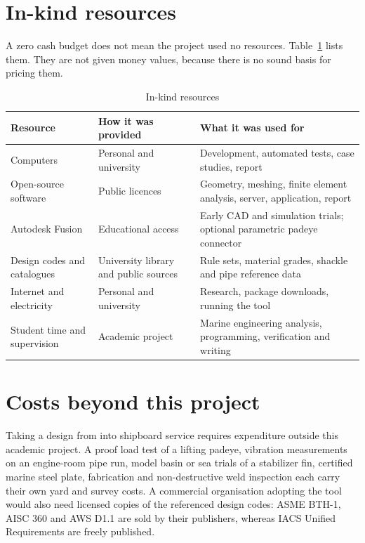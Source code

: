 \section{In-kind resources}
\label{sec:in-kind-resources}

A zero cash budget does not mean the project used no resources.
Table~\ref{tab:in-kind} lists them. They are not given money values, because
there is no sound basis for pricing them.

\begin{table}[H]
\centering
\caption{In-kind resources}
\label{tab:in-kind}
\small
\begin{tabularx}{\textwidth}{
    >{\raggedright\arraybackslash}p{}
    >{\raggedright\arraybackslash}X
    >{\raggedright\arraybackslash}X}
\toprule
\textbf{Resource} & \textbf{How it was provided} & \textbf{What it was used for}\\
\midrule
Computers & Personal and university & Development, automated tests, case studies, report\\
Open-source software & Public licences & Geometry, meshing, finite element analysis, server, application, report\\
Autodesk Fusion & Educational access & Early CAD and simulation trials; optional parametric padeye connector\\
Design codes and catalogues & University library and public sources & Rule sets, material grades, shackle and pipe reference data\\
Internet and electricity & Personal and university & Research, package downloads, running the tool\\
Student time and supervision & Academic project & Marine engineering analysis, programming, verification and writing\\
\bottomrule
\end{tabularx}
\end{table}

\section{Costs beyond this project}
\label{sec:budget-beyond}

Taking a design from \NEMO{} into shipboard service requires expenditure outside
this academic project. A proof load test of a lifting padeye, vibration
measurements on an engine-room pipe run, model basin or sea trials of a
stabilizer fin, certified marine steel plate, fabrication and non-destructive
weld inspection each carry their own yard and survey costs. A commercial
organisation adopting the tool would also need licensed copies of the
referenced design codes: ASME BTH-1, AISC 360 and AWS D1.1 are sold by their
publishers, whereas IACS Unified Requirements are freely published.
